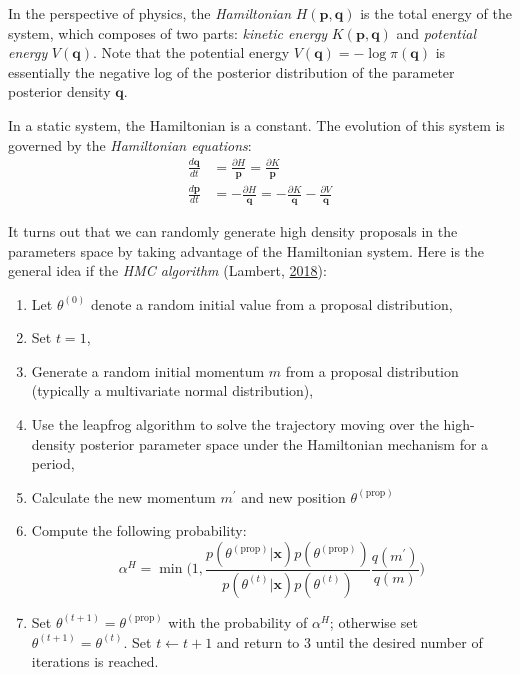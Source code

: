 \documentclass[12pt]{book}
\numberwithin{equation}{chapter}
\providecommand{\tightlist}{%
  \setlength{\itemsep}{0pt}\setlength{\parskip}{0pt}}
\begin{document}
In the perspective of physics, the \emph{Hamiltonian} \(H(\boldsymbol{p}, \boldsymbol{q})\) is the total energy of the system, which composes of two parts: \emph{kinetic energy} \(K(\boldsymbol{p}, \boldsymbol{q})\) and \emph{potential energy} \(V(\boldsymbol{q})\). Note that the potential energy \(V(\boldsymbol{q}) = -\log\pi(\boldsymbol{q})\) is essentially the negative log of the posterior distribution of the parameter posterior density \(\boldsymbol{q}\).

In a static system, the Hamiltonian is a constant. The evolution of this system is governed by the \emph{Hamiltonian equations}:
\begin{equation}
\begin{aligned}
\frac{d \boldsymbol{q}}{dt} &= \frac{\partial H}{\boldsymbol{p}} = \frac{\partial K}{\boldsymbol{p}}\\
\frac{d \boldsymbol{p}}{dt} &= -\frac{\partial H}{\boldsymbol{q}} = -\frac{\partial K}{\boldsymbol{q}} - \frac{\partial V}{\boldsymbol{q}}
\label{eq:hamiltonianequation}
\end{aligned}
\end{equation}

It turns out that we can randomly generate high density proposals in the parameters space by taking advantage of the Hamiltonian system. Here is the general idea if the \emph{HMC algorithm} (Lambert, \protect\hyperlink{ref-lambert2018student}{2018}):

\begin{enumerate}
\def\labelenumi{\arabic{enumi}.}
\tightlist
\item
  Let \(\theta^{(0)}\) denote a random initial value from a proposal distribution,
\item
  Set \(t = 1\),
\item
  Generate a random initial momentum \(m\) from a proposal distribution (typically a multivariate normal distribution),
\item
  Use the leapfrog algorithm to solve the trajectory moving over the high-density posterior parameter space under the Hamiltonian mechanism for a period,
\item
  Calculate the new momentum \(m^\prime\) and new position \(\theta^{(\text{prop})}\)
\item
  Compute the following probability:
  \begin{equation}
  \alpha^H = \min\bigg(1, \frac{p\left(\theta^{(\text{prop})} | \boldsymbol{x}\right)p(\theta^{(\text{prop})})}{p\left(\theta^{(t)} | \boldsymbol{x}\right)p(\theta^{(t)})} \frac{q(m^\prime)}{q(m)}\bigg)
  \label{eq:hmc}
  \end{equation}
\item
  Set \(\theta^{(t+1)} = \theta^{(\text{prop})}\) with the probability of \(\alpha^H\); otherwise set \(\theta^{(t+1)} = \theta^{(t)}\). Set \(t \leftarrow t + 1\) and return to 3 until the desired number of iterations is reached.
\end{enumerate}
\end{document}
